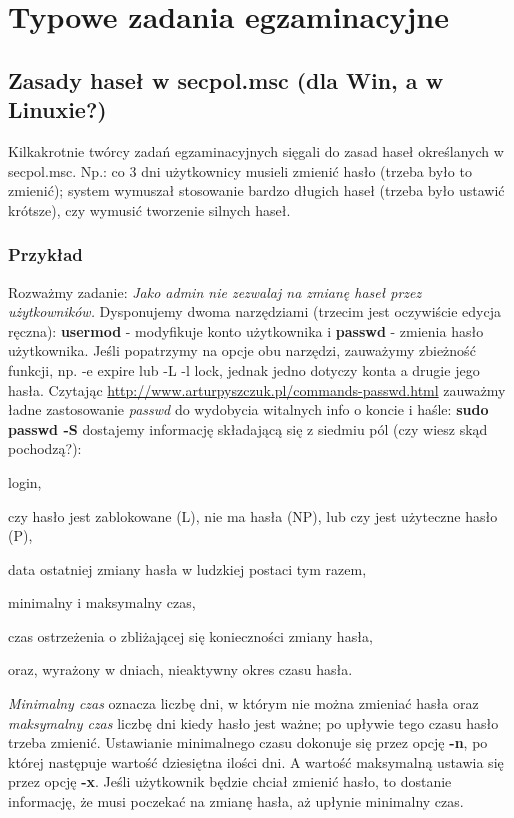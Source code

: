 \documentclass[a4paper,titlepage,12pt]{mwart}
\begin{document}
\section{Typowe zadania egzaminacyjne}
\subsection{Zasady haseł w secpol.msc (dla Win, a w Linuxie?)}
Kilkakrotnie twórcy zadań egzaminacyjnych sięgali do zasad haseł określanych w secpol.msc. Np.: co 3 dni użytkownicy musieli zmienić hasło (trzeba było to zmienić); system wymuszał stosowanie bardzo długich haseł (trzeba było ustawić krótsze), czy wymusić tworzenie silnych haseł.
\subsubsection{Przykład}
Rozważmy zadanie: \textit{Jako admin nie zezwalaj na zmianę haseł przez użytkowników.}\newline
Dysponujemy dwoma narzędziami (trzecim jest oczywiście edycja ręczna): \textbf{usermod} - modyfikuje konto użytkownika i \textbf{passwd} - zmienia hasło użytkownika. Jeśli popatrzymy na opcje obu narzędzi, zauważymy zbieżność funkcji, np. -e expire lub -L -l lock, jednak jedno dotyczy konta a drugie jego hasła. Czytając \url{http://www.arturpyszczuk.pl/commands-passwd.html} zauważmy ładne zastosowanie \textit{passwd} do wydobycia witalnych info o koncie i haśle: \textbf{sudo passwd -S} dostajemy informację składającą się z siedmiu pól (czy wiesz skąd pochodzą?):\newline
\begin{inparaenum}
\item login,
\item czy hasło jest zablokowane (L), nie ma hasła (NP), lub czy jest użyteczne hasło (P),
\item data ostatniej zmiany hasła w ludzkiej postaci tym razem,
\item minimalny i maksymalny czas,
\item czas ostrzeżenia o zbliżającej się konieczności zmiany hasła,
\item oraz, wyrażony w dniach, nieaktywny okres czasu hasła.
\end{inparaenum}
\textit{Minimalny czas} oznacza liczbę dni, w którym nie można zmieniać hasła oraz \textit{maksymalny czas} liczbę dni kiedy hasło jest ważne; po upływie tego czasu hasło trzeba zmienić. Ustawianie minimalnego czasu dokonuje się przez opcję \textbf{-n}, po której następuje wartość dziesiętna ilości dni. A wartość maksymalną ustawia się przez opcję \textbf{-x}. Jeśli użytkownik będzie chciał zmienić hasło, to dostanie informację, że musi poczekać na zmianę hasła, aż upłynie minimalny czas.
\end{document}

